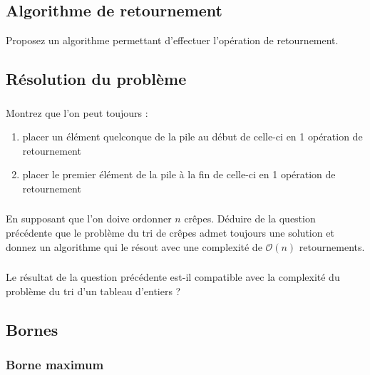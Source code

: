 \documentclass
[12pt]
{article}
\begin{document}
\subsection{Algorithme de retournement}

Proposez un algorithme permettant d'effectuer l'opération de retournement.

\subsection{Résolution du problème}

\subsubsection{}
Montrez que l'on peut toujours :

\begin{enumerate}
    \item placer un élément quelconque de la pile au début de celle-ci en 1 opération de retournement
    \item placer le premier élément de la pile à la fin de celle-ci en 1 opération de retournement
\end{enumerate}

\subsubsection{}

En supposant que l'on doive ordonner $n$ crêpes. Déduire de la question précédente que le problème du tri de crêpes admet toujours une solution et donnez un algorithme qui le résout avec une complexité de $\mathcal{O}(n)$ retournements.

\subsubsection{}

Le résultat de la question précédente est-il compatible avec la complexité du problème du tri d'un tableau d'entiers ?

\subsection{Bornes}

\subsubsection{Borne maximum}
\end{document}
